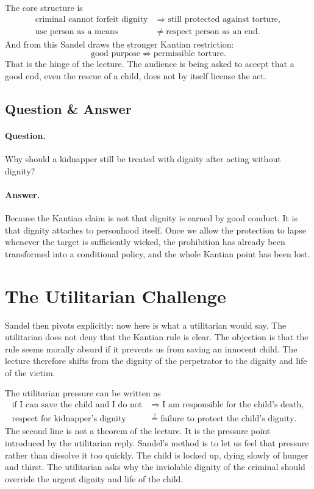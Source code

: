 The core structure is
\begin{align}
\text{criminal cannot forfeit dignity}
&\Longrightarrow
\text{still protected against torture},\\
\text{use person as a means}
&\neq
\text{respect person as an end}.
\end{align}
And from this Sandel draws the stronger Kantian restriction:
\begin{equation}
\text{good purpose}
\not\Rightarrow
\text{permissible torture}.
\end{equation}
That is the hinge of the lecture. The audience is being asked to accept that a good end, even the rescue of a child, does not by itself license the act.

\subsection{Question \& Answer}

\paragraph{Question.} Why should a kidnapper still be treated with dignity after acting without dignity?

\paragraph{Answer.} Because the Kantian claim is not that dignity is earned by good conduct. It is that dignity attaches to personhood itself. Once we allow the protection to lapse whenever the target is sufficiently wicked, the prohibition has already been transformed into a conditional policy, and the whole Kantian point has been lost.

\section{The Utilitarian Challenge}

Sandel then pivots explicitly: now here is what a utilitarian would say. The utilitarian does not deny that the Kantian rule is clear. The objection is that the rule seems morally absurd if it prevents us from saving an innocent child. The lecture therefore shifts from the dignity of the perpetrator to the dignity and life of the victim.

The utilitarian pressure can be written as
\begin{align}
\text{if I can save the child and I do not}
&\Longrightarrow
\text{I am responsible for the child's death},\\
\text{respect for kidnapper's dignity}
&\stackrel{?}{=}
\text{failure to protect the child's dignity}.
\end{align}
The second line is not a theorem of the lecture. It is the pressure point introduced by the utilitarian reply. Sandel's method is to let us feel that pressure rather than dissolve it too quickly. The child is locked up, dying slowly of hunger and thirst. The utilitarian asks why the inviolable dignity of the criminal should override the urgent dignity and life of the child.

